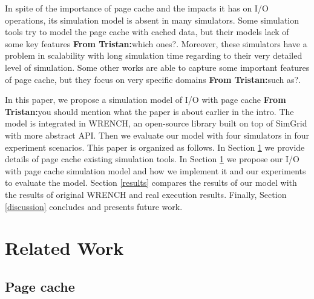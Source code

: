 \documentclass[conference]{IEEEtran}
\newcommand{\tristan}[1]{\color{orange}\textbf{From Tristan:}#1\color{black}}
\begin{document}
		In spite of the importance of page cache and the impacts it has on I/O 
		operations, its simulation model is absent in many simulators. 
		Some simulation tools try to model the page cache with cached data, 
		but their models lack of some key features \cite{nunez2012simcan} 
		\cite{nunez2012icancloud} \tristan{which ones?}. 
		Moreover, these simulators have a problem in scalability with 
		long simulation time regarding to their very detailed level of simulation.
		Some other works are able to capture some important features of page cache, 
		but they focus on very specific domains \cite{xu2018saving} \tristan{such as?}.
		
		In this paper, we propose a simulation model of I/O with page cache \tristan{you should mention what the paper is about earlier in the intro}.
		The model is integrated in WRENCH, an open-source library built 
		on top of SimGrid with more abstract API. 
		Then we evaluate our model with four simulators in four 
		experiment scenarios. 
		This paper is organized as follows. 
		In Section \ref{relatedwork} we provide details of page cache 
		existing simulation tools.
		In Section \ref{relatedwork} we propose our I/O with page 
		cache simulation model and how we implement it and our experiments 
		to evaluate the model.  
		Section \ref{results} compares the results of our model with the results 
		of original WRENCH and real execution results. 
		Finally, Section \ref{discussion} concludes and presents future 
		work.  
		
		
		
	\section{Related Work}		
	\label{relatedwork}	
		
		\subsection{Page cache}							
			
\end{document}
